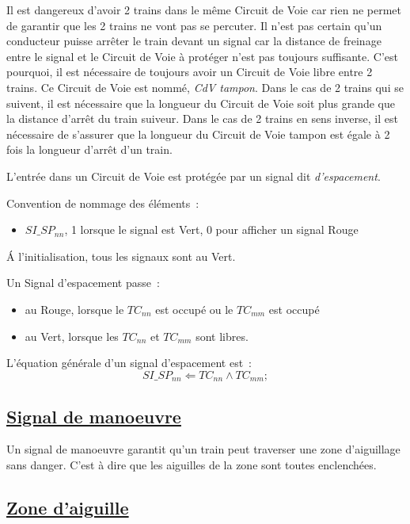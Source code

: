 Il est dangereux d'avoir 2 trains dans le même Circuit de Voie car
rien ne permet de garantir que les 2 trains ne vont pas se
percuter. Il n'est pas certain qu'un conducteur puisse arrêter le
train devant un signal car la distance de freinage entre le signal et
le Circuit de Voie à protéger n'est pas toujours suffisante. C'est
pourquoi, il est nécessaire de toujours avoir un Circuit de Voie libre
entre 2 trains. Ce Circuit de Voie est nommé, \emph{CdV tampon}.  Dans
le cas de 2 trains qui se suivent, il est nécessaire que la longueur
du Circuit de Voie soit plus grande que la distance d'arrêt du train
suiveur.  Dans le cas de 2 trains en sens inverse, il est nécessaire
de s'assurer que la longueur du Circuit de Voie tampon est égale à 2
fois la longueur d'arrêt d'un train.

L'entrée dans un Circuit de Voie est protégée par un signal dit
\emph{d'espacement}.

Convention de nommage des éléments~:
\begin{itemize}
\item $SI\_SP_{nn}$, 1 lorsque le signal est Vert, 0 pour afficher un
  signal Rouge
\end{itemize}

\'A l'initialisation, tous les signaux sont au Vert.

Un Signal d'espacement passe~:
\begin{itemize}
\item au Rouge, lorsque le $TC_{nn}$ est occupé ou le $TC_{mm}$ est occupé
\item au Vert, lorsque les $TC_{nn}$ et $TC_{mm}$ sont libres.
\end{itemize}

\medskip
L'équation générale d'un signal d'espacement est~:
$$\boxed{
  SI\_SP_{nn} \Leftarrow TC_{nn} \land TC_{mm};
}$$


\subsection{\underline{Signal de manoeuvre}}
\label{sec:esp}

Un signal de manoeuvre garantit qu'un train peut traverser une zone
d'aiguillage sans danger. C'est à dire que les aiguilles de la zone
sont toutes enclenchées.




\subsection{\underline{Zone d'aiguille}}
\label{sec:aig}

